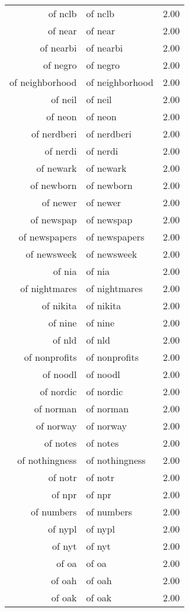 \begin{table}[ht]
\begin{tabular}{rlr}
  of nclb & of nclb & 2.00 \\ 
  of near & of near & 2.00 \\ 
  of nearbi & of nearbi & 2.00 \\ 
  of negro & of negro & 2.00 \\ 
  of neighborhood & of neighborhood & 2.00 \\ 
  of neil & of neil & 2.00 \\ 
  of neon & of neon & 2.00 \\ 
  of nerdberi & of nerdberi & 2.00 \\ 
  of nerdi & of nerdi & 2.00 \\ 
  of newark & of newark & 2.00 \\ 
  of newborn & of newborn & 2.00 \\ 
  of newer & of newer & 2.00 \\ 
  of newspap & of newspap & 2.00 \\ 
  of newspapers & of newspapers & 2.00 \\ 
  of newsweek & of newsweek & 2.00 \\ 
  of nia & of nia & 2.00 \\ 
  of nightmares & of nightmares & 2.00 \\ 
  of nikita & of nikita & 2.00 \\ 
  of nine & of nine & 2.00 \\ 
  of nld & of nld & 2.00 \\ 
  of nonprofits & of nonprofits & 2.00 \\ 
  of noodl & of noodl & 2.00 \\ 
  of nordic & of nordic & 2.00 \\ 
  of norman & of norman & 2.00 \\ 
  of norway & of norway & 2.00 \\ 
  of notes & of notes & 2.00 \\ 
  of nothingness & of nothingness & 2.00 \\ 
  of notr & of notr & 2.00 \\ 
  of npr & of npr & 2.00 \\ 
  of numbers & of numbers & 2.00 \\ 
  of nypl & of nypl & 2.00 \\ 
  of nyt & of nyt & 2.00 \\ 
  of oa & of oa & 2.00 \\ 
  of oah & of oah & 2.00 \\ 
  of oak & of oak & 2.00 \\ 

\end{tabular}
\end{table}
